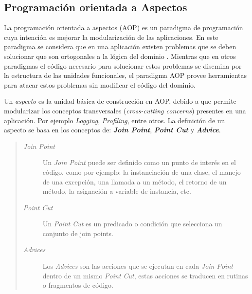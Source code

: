 \subsection{Programación orientada a Aspectos}

	La programación orientada a aspectos (AOP) es un paradigma de programación cuya
	intención es mejorar la modularización de las aplicaciones.
	En este paradigma se considera que en una aplicación existen problemas 
	que se deben solucionar que son ortogonales a la lógica del dominio \cite{Kicz97a}.
	Mientras que en otros paradigmas el código necesario para solucionar estos problemas 
	se disemina por la estructura de las unidades funcionales,
	el paradigma AOP provee herramientas para atacar estos problemas sin modificar el código del dominio.

	\bigskip
	
	Un \emph{aspecto} es la unidad básica de construcción en AOP, debido a que permite
	modularizar los conceptos transversales (\emph{cross-cutting concerns}) presentes en una aplicación.
	Por ejemplo \emph{Logging}, \emph{Profiling}, entre otros.
	La definición de un aspecto se basa en los conceptos de: {\bf \emph{Join
	Point}}, {\bf \emph{ Point Cut}} y {\bf \emph{ Advice}}.
	
	\begin{quote}
	
	\begin{description}
		\item[\emph{Join Point}] Un \emph{Join Point} puede ser definido como un punto
		de interés en el código, como por ejemplo: la instanciación de una clase, el manejo de una
		excepción, una llamada a un método, el retorno de un método, la asignación a variable de instancia, etc.
		
		\item[\emph{Point Cut}] Un \emph{Point Cut} es un predicado o condición que selecciona un conjunto 
		de join points.
		
		\item[\emph{Advices}] Los \emph{Advices} son las acciones que se ejecutan en cada \emph{Join Point} dentro de un mismo
		\emph{Point Cut}, estas acciones se traducen en rutinas o fragmentos de código.
	
	\end{description}
	\end{quote}
